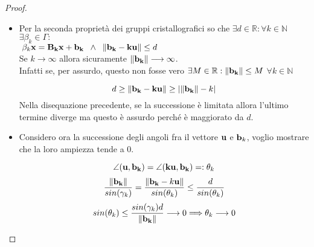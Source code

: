 \documentclass[10pt,a4paper]{article}
\begin{document}
\begin{proof}
\begin{itemize}
\item  Per la seconda proprietà dei gruppi cristallografici so che $ \exists d \in \mathbb{R} : \forall k \in \mathbb{N} $ $  \exists \beta_k \in \Gamma : $ \\
$ \; \beta_k \vb{x} = \vb{B_k x + b_k}  \; \; \land \; \;\norm{\vb{b_k - ku }} \leq d $ 
\\
Se $k \longrightarrow \infty$ allora sicuramente $ \norm{\vb{b_k}} \longrightarrow \infty$.  \\
Infatti se, per assurdo, questo non fosse vero $\exists M \in \mathbb{R} : \norm{\vb{b_k}} \leq M $   $  \forall k \in \mathbb{N} $

\[ d \geq \norm{\vb{b_k - ku}} \geq | \norm{\vb{b_k}} - k | \]
Nella disequazione  precedente, se la successione è limitata allora l'ultimo termine diverge ma questo è assurdo perché è maggiorato da $d$. 

\item Considero ora la successione degli angoli fra il vettore $\vb{u}$ e $\vb{b}_k$, voglio mostrare che la loro ampiezza tende a 0. 
\begin{minipage}{0.5\textwidth}
\end{minipage}\hfill
\begin{minipage}{0.5\textwidth}
	\[ \angle (\vb{u , b_k}) = \angle (\vb{ku, b_k}) = : \theta_k \]
\[ \frac{\norm{\vb{b_k}}}{sin(\gamma_k)} = \frac{\norm{\vb{b_k} - k\vb{u}}}{sin(\theta_k)}  \leq \frac{d}{sin(\theta_k)} \]
\[  sin(\theta_k) \leq \frac{sin(\gamma_k)d}{\norm{\vb{b_k}}} \longrightarrow 0 \Longrightarrow \theta_k \longrightarrow 0 \]
\end{minipage}







\end{itemize}
\end{proof}
\end{document}
